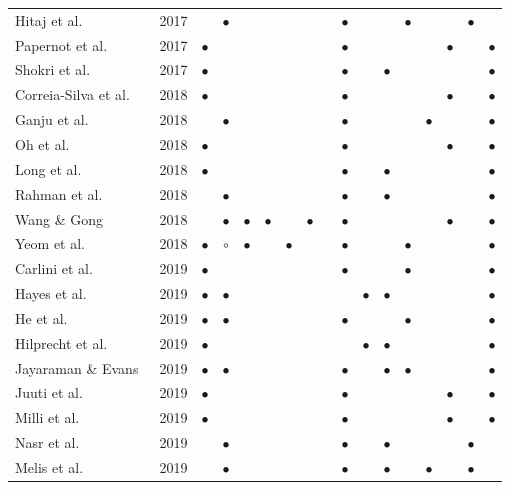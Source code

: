 \begin{table}[t]
\begin{tabular}{@{} l c | c c | c c c c c c c | c c  c c | c c @{} }
Hitaj et al.~& 2017 &  & $\bullet$  & & & &  & & $\bullet$ & & & $\bullet$ & & & $\bullet$ & \\
Papernot et al.~ & 2017 & $\bullet$ & & & & & & &$\bullet$ & & & & & $\bullet$ & & $\bullet$\\
Shokri et al.~  & 2017 & $\bullet$  & & & & & & &$\bullet$ & & $\bullet$ & & &  & & $\bullet$\\
Correia-Silva et al.~ & 2018 & $\bullet$ & & & & & & &$\bullet$ & & & & & $\bullet$ & & $\bullet$\\
Ganju et al.~ & 2018 &  & $\bullet$ & & & & & & $\bullet$& & & & $\bullet$ & & & $\bullet$ \\
Oh et al.~ & 2018 & $\bullet$   & & & & & & & $\bullet$ & & & & & $\bullet$ & & $\bullet$\\
Long et al.~ & 2018 & $\bullet$  & & & & & & & $\bullet$ & & $\bullet$ & & & & & $\bullet$\\
Rahman et al.~ & 2018 &  & $\bullet$ & & & & & & $\bullet$ & & $\bullet$ & & & & & $\bullet$\\
Wang \& Gong~ & 2018 &  & $\bullet$   & $\bullet$ & $\bullet$ & & $\bullet$ & & $\bullet$ & & & & &  $\bullet$ & & $\bullet$\\
Yeom et al.~ & 2018 & $\bullet$  & $\circ$  & $\bullet$ & & $\bullet$ & & &$\bullet$ & & & $\bullet$ & &  & & $\bullet$ \\
Carlini et al.~ & 2019 & $\bullet$ & & & & & & & $\bullet$ &  &  & $\bullet$ & & & & $\bullet$\\
Hayes et al.~ & 2019 & $\bullet$  & $\bullet$  & & & & & & & $\bullet$ & $\bullet$ & & &  & & $\bullet$\\
He et al.~ & 2019 & $\bullet$   & $\bullet$  & & & & & & $\bullet$ &  & & $\bullet$ & & & & $\bullet$ \\
Hilprecht et al.~ & 2019 & $\bullet$  & & & & & & & & $\bullet$ & $\bullet$ & & & & & $\bullet$ \\
Jayaraman \& Evans~ & 2019 &  $\bullet$ & $\bullet$  & & & & & & $\bullet$ & & $\bullet$ & $\bullet$ & & & & $\bullet$\\
Juuti et al.~ & 2019 & $\bullet$&   & & & & & & $\bullet$ & &  & & &  $\bullet$&  & $\bullet$\\
Milli et al.~  & 2019 & $\bullet$& & & & & & & $\bullet$ & & & & & $\bullet$ &  & $\bullet$ \\
Nasr et al.~ & 2019 &  & $\bullet$ & & & & & & $\bullet$& & $\bullet$ & & &  & $\bullet$ & \\
Melis et al.~ & 2019 &  & $\bullet$ & & & & & & $\bullet$ & & $\bullet$ & & $\bullet$ & & $\bullet$ &\\

\end{tabular}
\end{table}
